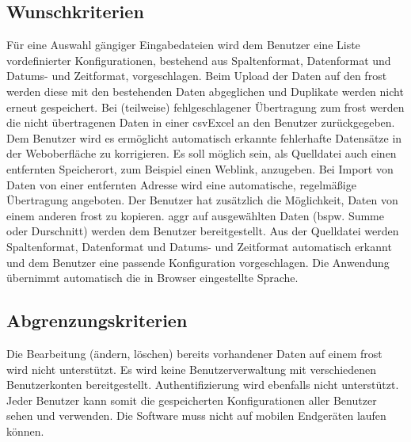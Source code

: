 \documentclass[a4paper, 12 pt]{article}
\begin{document}
	\subsection{Wunschkriterien}
	
	
	Für eine Auswahl gängiger Eingabedateien wird dem Benutzer eine Liste vordefinierter Konfigurationen, bestehend aus Spaltenformat, Datenformat und Datums- und Zeitformat, vorgeschlagen.
	Beim Upload der Daten auf den \gls{frost} werden diese mit den bestehenden Daten abgeglichen und Duplikate werden nicht erneut gespeichert.
	Bei (teilweise) fehlgeschlagener Übertragung zum \gls{frost} werden die nicht übertragenen Daten in einer \gls{csvExcel} an den Benutzer zurückgegeben.
	Dem Benutzer wird es ermöglicht automatisch erkannte fehlerhafte Datensätze in der Weboberfläche zu korrigieren.
	Es soll möglich sein, als Quelldatei auch einen entfernten Speicherort, zum Beispiel einen Weblink, anzugeben.
	Bei Import von Daten von einer entfernten Adresse wird eine automatische, regelmäßige Übertragung angeboten.
	Der Benutzer hat zusätzlich die Möglichkeit, Daten von einem anderen \gls{frost} zu kopieren.
	\gls{aggr} auf ausgewählten Daten (bspw. Summe oder Durschnitt) werden dem Benutzer bereitgestellt.
    Aus der Quelldatei werden Spaltenformat, Datenformat und Datums- und Zeitformat automatisch erkannt und dem Benutzer eine passende Konfiguration vorgeschlagen.
	Die Anwendung übernimmt automatisch die in Browser eingestellte Sprache.
	

	\subsection{Abgrenzungskriterien}
	
Die Bearbeitung (ändern, löschen) bereits vorhandener Daten auf einem \gls{frost} wird nicht unterstützt.
Es wird keine Benutzerverwaltung mit verschiedenen Benutzerkonten bereitgestellt. Authentifizierung wird ebenfalls nicht unterstützt.
Jeder Benutzer kann somit die gespeicherten Konfigurationen aller Benutzer sehen und verwenden.
	Die Software muss nicht auf mobilen Endgeräten laufen können.
\end{document}
